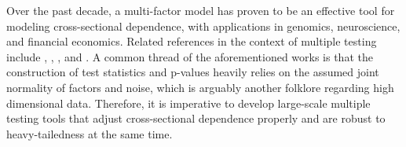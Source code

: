 Over the past decade, a multi-factor model has proven to be an effective tool for modeling cross-sectional dependence, with applications in genomics, neuroscience, and financial economics.
Related references in the context of multiple testing include \cite{LS2008}, \cite{FKC2009}, \cite{FHG2012}, \cite{DS2012} and \cite{FH2017}.
A common thread of the aforementioned works is that the construction of test statistics and p-values heavily relies on the assumed joint normality of factors and noise, which is arguably another folklore regarding high dimensional data.  Therefore, it is imperative to develop large-scale multiple testing tools that adjust cross-sectional dependence properly and are robust to heavy-tailedness at the same time.

